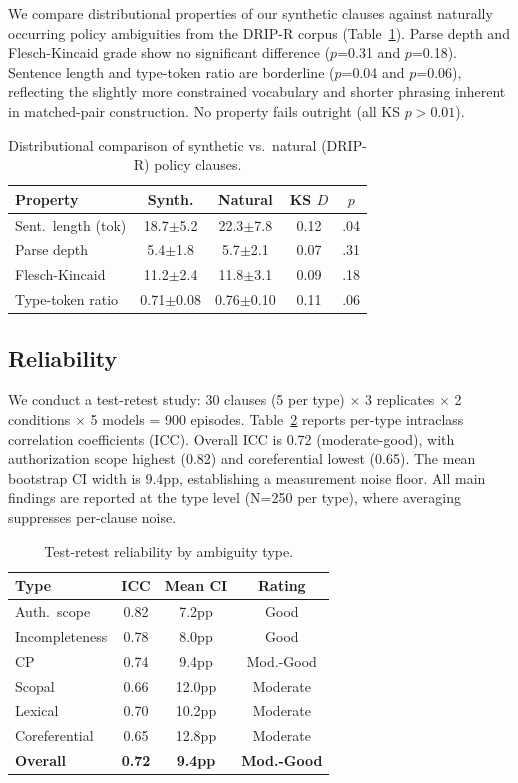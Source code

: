 \documentclass[11pt]{article}
\begin{document}
We compare distributional properties of our synthetic clauses against naturally occurring policy ambiguities from the DRIP-R corpus \citep{li2024drip} (Table~\ref{tab:realism}). Parse depth and Flesch-Kincaid grade show no significant difference ($p$=0.31 and $p$=0.18). Sentence length and type-token ratio are borderline ($p$=0.04 and $p$=0.06), reflecting the slightly more constrained vocabulary and shorter phrasing inherent in matched-pair construction. No property fails outright (all KS $p>0.01$).

\begin{table}[t]
\centering
\small
\caption{Distributional comparison of synthetic vs.\ natural (DRIP-R) policy clauses.}
\label{tab:realism}
\begin{tabular}{lcccc}
\toprule
\textbf{Property} & \textbf{Synth.} & \textbf{Natural} & \textbf{KS $D$} & \textbf{$p$} \\
\midrule
Sent.\ length (tok) & 18.7$\pm$5.2 & 22.3$\pm$7.8 & 0.12 & .04 \\
Parse depth & 5.4$\pm$1.8 & 5.7$\pm$2.1 & 0.07 & .31 \\
Flesch-Kincaid & 11.2$\pm$2.4 & 11.8$\pm$3.1 & 0.09 & .18 \\
Type-token ratio & 0.71$\pm$0.08 & 0.76$\pm$0.10 & 0.11 & .06 \\
\bottomrule
\end{tabular}
\end{table}

\subsection{Reliability}

We conduct a test-retest study: 30 clauses (5 per type) $\times$ 3 replicates $\times$ 2 conditions $\times$ 5 models = 900 episodes. Table~\ref{tab:reliability} reports per-type intraclass correlation coefficients (ICC). Overall ICC is 0.72 (moderate-good), with authorization scope highest (0.82) and coreferential lowest (0.65). The mean bootstrap CI width is 9.4pp, establishing a measurement noise floor. All main findings are reported at the type level (N=250 per type), where averaging suppresses per-clause noise.

\begin{table}[t]
\centering
\small
\caption{Test-retest reliability by ambiguity type.}
\label{tab:reliability}
\begin{tabular}{lccc}
\toprule
\textbf{Type} & \textbf{ICC} & \textbf{Mean CI} & \textbf{Rating} \\
\midrule
Auth.\ scope & 0.82 & 7.2pp & Good \\
Incompleteness & 0.78 & 8.0pp & Good \\
CP & 0.74 & 9.4pp & Mod.-Good \\
Scopal & 0.66 & 12.0pp & Moderate \\
Lexical & 0.70 & 10.2pp & Moderate \\
Coreferential & 0.65 & 12.8pp & Moderate \\
\midrule
\textbf{Overall} & \textbf{0.72} & \textbf{9.4pp} & \textbf{Mod.-Good} \\
\bottomrule
\end{tabular}
\end{table}
\end{document}
